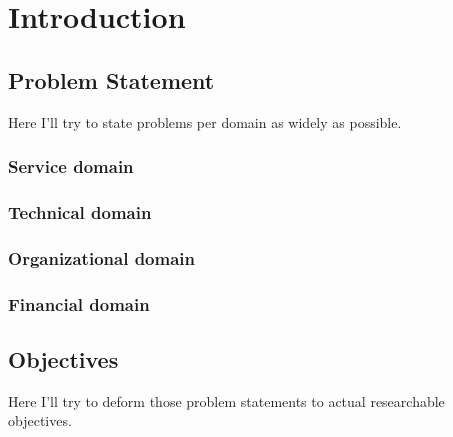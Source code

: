 \documentclass[15pt]{article}
\begin{document}




\tableofcontents
\newpage





\section{Introduction}
  \subsection{Problem Statement}
  Here I'll try to state problems per domain as widely as possible.
    \subsubsection{Service domain}
    \subsubsection{Technical domain}
    \subsubsection{Organizational domain}
    \subsubsection{Financial domain}
  \subsection{Objectives}
  	Here I'll try to deform those problem statements to actual researchable objectives.
\end{document}
